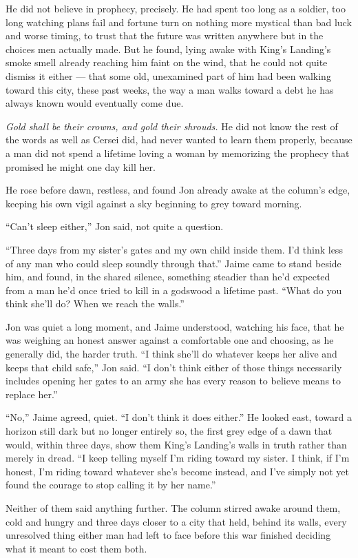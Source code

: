 He did not believe in prophecy, precisely. He had spent too long as a soldier, too long watching plans fail and fortune turn on nothing more mystical than bad luck and worse timing, to trust that the future was written anywhere but in the choices men actually made. But he found, lying awake with King’s Landing’s smoke smell already reaching him faint on the wind, that he could not quite dismiss it either — that some old, unexamined part of him had been walking toward this city, these past weeks, the way a man walks toward a debt he has always known would eventually come due.

\textit{Gold shall be their crowns, and gold their shrouds.} He did not know the rest of the words as well as Cersei did, had never wanted to learn them properly, because a man did not spend a lifetime loving a woman by memorizing the prophecy that promised he might one day kill her.

He rose before dawn, restless, and found Jon already awake at the column’s edge, keeping his own vigil against a sky beginning to grey toward morning.

“Can’t sleep either,” Jon said, not quite a question.

“Three days from my sister’s gates and my own child inside them. I’d think less of any man who could sleep soundly through that.” Jaime came to stand beside him, and found, in the shared silence, something steadier than he’d expected from a man he’d once tried to kill in a godswood a lifetime past. “What do you think she’ll do? When we reach the walls.”

Jon was quiet a long moment, and Jaime understood, watching his face, that he was weighing an honest answer against a comfortable one and choosing, as he generally did, the harder truth. “I think she’ll do whatever keeps her alive and keeps that child safe,” Jon said. “I don’t think either of those things necessarily includes opening her gates to an army she has every reason to believe means to replace her.”

“No,” Jaime agreed, quiet. “I don’t think it does either.” He looked east, toward a horizon still dark but no longer entirely so, the first grey edge of a dawn that would, within three days, show them King’s Landing’s walls in truth rather than merely in dread. “I keep telling myself I’m riding toward my sister. I think, if I’m honest, I’m riding toward whatever she’s become instead, and I’ve simply not yet found the courage to stop calling it by her name.”

Neither of them said anything further. The column stirred awake around them, cold and hungry and three days closer to a city that held, behind its walls, every unresolved thing either man had left to face before this war finished deciding what it meant to cost them both.